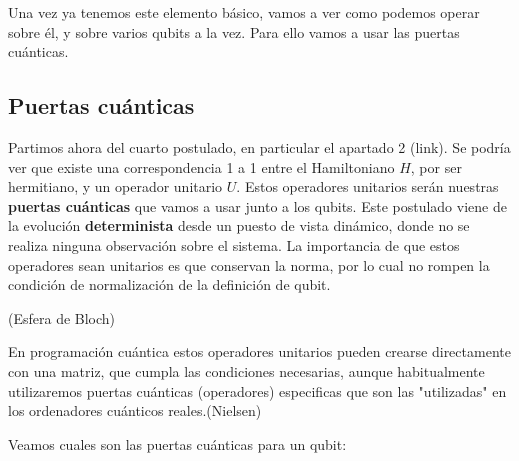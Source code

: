 \vspace{5pt}
 Una vez ya tenemos este elemento básico, vamos a ver como podemos operar sobre él, y sobre varios qubits a la vez. Para ello vamos a usar las puertas cuánticas.


\subsection{Puertas cuánticas}

 Partimos ahora del cuarto postulado, en particular el apartado 2 (link). Se podría ver que existe una correspondencia 1 a 1 entre el Hamiltoniano $H$, por ser hermitiano, y un operador unitario $U$. Estos operadores unitarios serán nuestras \textbf{puertas cuánticas} que vamos a usar junto a los qubits. Este postulado viene de la evolución \textbf{determinista} desde un puesto de vista dinámico, donde no se realiza ninguna observación sobre el sistema. La importancia de que estos operadores sean unitarios es que conservan la norma, por lo cual no rompen la condición de normalización de la definición de qubit. \newline

 (Esfera de Bloch)
 
 En programación cuántica estos operadores unitarios pueden crearse directamente con una matriz, que cumpla las condiciones necesarias, aunque habitualmente utilizaremos puertas cuánticas (operadores) especificas que son las "utilizadas" en los ordenadores cuánticos reales.(Nielsen)

 Veamos cuales son las puertas cuánticas para un qubit:

